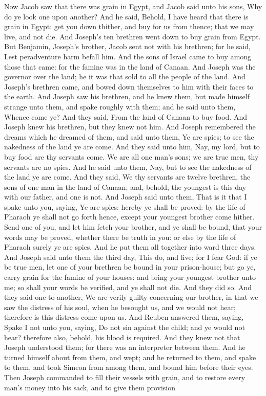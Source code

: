 Now Jacob saw that there was grain in Egypt, and Jacob said unto his sons, Why do ye look one upon another? And he said, Behold, I have heard that there is grain in Egypt: get you down thither, and buy for us from thence; that we may live, and not die. And Joseph’s ten brethren went down to buy grain from Egypt. But Benjamin, Joseph’s brother, Jacob sent not with his brethren; for he said, Lest peradventure harm befall him. And the sons of Israel came to buy among those that came: for the famine was in the land of Canaan. And Joseph was the governor over the land; he it was that sold to all the people of the land. And Joseph’s brethren came, and bowed down themselves to him with their faces to the earth. And Joseph saw his brethren, and he knew them, but made himself strange unto them, and spake roughly with them; and he said unto them, Whence come ye? And they said, From the land of Canaan to buy food. And Joseph knew his brethren, but they knew not him. And Joseph remembered the dreams which he dreamed of them, and said unto them, Ye are spies; to see the nakedness of the land ye are come. And they said unto him, Nay, my lord, but to buy food are thy servants come. We are all one man’s sons; we are true men, thy servants are no spies. And he said unto them, Nay, but to see the nakedness of the land ye are come. And they said, We thy servants are twelve brethren, the sons of one man in the land of Canaan; and, behold, the youngest is this day with our father, and one is not. And Joseph said unto them, That is it that I spake unto you, saying, Ye are spies: hereby ye shall be proved: by the life of Pharaoh ye shall not go forth hence, except your youngest brother come hither. Send one of you, and let him fetch your brother, and ye shall be bound, that your words may be proved, whether there be truth in you: or else by the life of Pharaoh surely ye are spies. And he put them all together into ward three days.  And Joseph said unto them the third day, This do, and live; for I fear God: if ye be true men, let one of your brethren be bound in your prison-house; but go ye, carry grain for the famine of your houses: and bring your youngest brother unto me; so shall your words be verified, and ye shall not die. And they did so. And they said one to another, We are verily guilty concerning our brother, in that we saw the distress of his soul, when he besought us, and we would not hear; therefore is this distress come upon us. And Reuben answered them, saying, Spake I not unto you, saying, Do not sin against the child; and ye would not hear? therefore also, behold, his blood is required. And they knew not that Joseph understood them; for there was an interpreter between them. And he turned himself about from them, and wept; and he returned to them, and spake to them, and took Simeon from among them, and bound him before their eyes. Then Joseph commanded to fill their vessels with grain, and to restore every man’s money into his sack, and to give them provision 